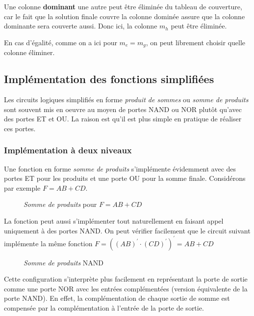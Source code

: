 \documentclass[11pt]{article}
\begin{document}
Une colonne \textbf{dominant} une autre peut être éliminée du tableau de
couverture, car le fait que la solution finale couvre la colonne
dominée assure que la colonne dominante sera couverte aussi. Donc ici,
la colonne \(m_h\) peut être éliminée.

En cas d'égalité, comme on a ici pour \(m_e = m_g\), on peut librement
choisir quelle colonne éliminer.

\subsection{Implémentation des fonctions simplifiées}
\label{sec:orgb5eb7dd}

Les circuits logiques simplifiés en forme \emph{produit de sommes} ou
\emph{somme de produits} sont souvent mis en oeuvre au moyen de portes NAND
ou NOR plutôt qu'avec des portes ET et OU. La raison est qu'il est
plus simple en pratique de réaliser ces portes.

\subsubsection{Implémentation à deux niveaux}
\label{sec:org4936a3d}

Une fonction en forme \emph{somme de produits} s'implémente évidemment avec
des portes ET pour les produits et une porte OU pour la somme
finale. Considérons par exemple \(F = AB + CD\).

\begin{figure}[htbp]
\centering

\caption{\label{fig:org5243133}\emph{Somme de produits} pour \(F = AB + CD\)}
\end{figure} 

La fonction peut aussi s'implémenter tout naturellement en faisant
appel uniquement à des portes NAND. On peut vérifier facilement que le
circuit suivant implémente la même fonction \(F = ((AB)^\prime \cdot
(CD)^\prime)^\prime = AB + CD\)

\begin{figure}[htbp]
\centering

\caption{\label{fig:orgbf79097}\emph{Somme de produits} NAND}
\end{figure} 

Cette configuration s'interprète plus facilement en représentant la
porte de sortie comme une porte NOR avec les entrées complémentées
(version équivalente de la porte NAND). En effet, la complémentation
de chaque sortie de somme est compensée par la complémentation à
l'entrée de la porte de sortie.
\end{document}
